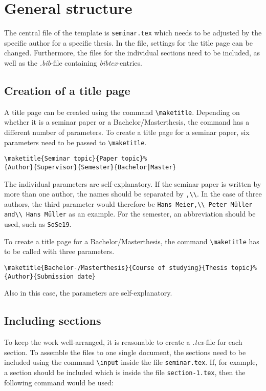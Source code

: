 %
\section{General structure}
%
The central file of the template is \texttt{seminar.tex} which needs to be adjusted by the specific author for a specific thesis.
In the file, settings for the title page can be changed.
Furthermore, the files for the individual sections need to be included, as well as the \textit{.bib}-file containing \textit{bibtex}-entries.
%
\subsection{Creation of a title page}
%
A title page can be created using the command \texttt{\textbackslash maketitle}. 
Depending on whether it is a seminar paper or a Bachelor/Masterthesis, the command has a different number of parameters. 
To create a title page for a seminar paper, six parameters need to be passed to \texttt{\textbackslash maketitle}.
%
\begin{verbatim}
\maketitle{Seminar topic}{Paper topic}%
{Author}{Supervisor}{Semester}{Bachelor|Master}
\end{verbatim}
%
The individual parameters are self-explanatory.
If the seminar paper is written by more than one author, the names should be separated by \texttt{,\textbackslash\textbackslash}.
In the case of three authors, the third parameter would therefore be  \texttt{Hans Meier,\textbackslash\textbackslash\ Peter Müller and\textbackslash\textbackslash\ Hans Müller} as an example.
For the semester, an abbreviation should be used, such as \texttt{SoSe19}.

To create a title page for a Bachelor/Masterthesis, the command \texttt{\textbackslash maketitle} has to be called with three parameters.
%
\begin{verbatim}
\maketitle{Bachelor-/Masterthesis}{Course of studying}{Thesis topic}%
{Author}{Submission date}
\end{verbatim}
%
Also in this case, the parameters are self-explanatory.
%
\subsection{Including sections}
%
To keep the work well-arranged, it is reasonable to create a \textit{.tex}-file for each section.
To assemble the files to one single document, the sections need to be included using the command  \texttt{\textbackslash input} inside the file \texttt{seminar.tex}.
If, for example, a section should be included which is inside the file \texttt{section-1.tex}, then the following command would be used:

